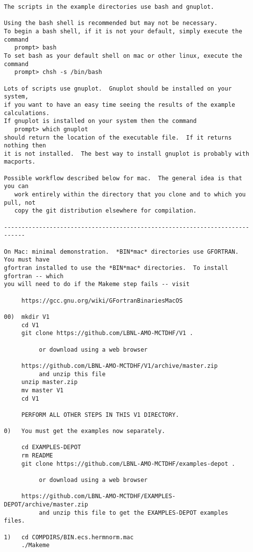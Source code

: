 \begin{verbatim}
The scripts in the example directories use bash and gnuplot.  

Using the bash shell is recommended but may not be necessary.
To begin a bash shell, if it is not your default, simply execute the command
   prompt> bash
To set bash as your default shell on mac or other linux, execute the command
   prompt> chsh -s /bin/bash

Lots of scripts use gnuplot.  Gnuplot should be installed on your system,
if you want to have an easy time seeing the results of the example calculations.
If gnuplot is installed on your system then the command
   prompt> which gnuplot
should return the location of the executable file.  If it returns nothing then
it is not installed.  The best way to install gnuplot is probably with macports.

Possible workflow described below for mac.  The general idea is that you can 
   work entirely within the directory that you clone and to which you pull, not 
   copy the git distribution elsewhere for compilation.

----------------------------------------------------------------------------

On Mac: minimal demonstration.  *BIN*mac* directories use GFORTRAN.  You must have
gfortran installed to use the *BIN*mac* directories.  To install gfortran -- which
you will need to do if the Makeme step fails -- visit 

     https://gcc.gnu.org/wiki/GFortranBinariesMacOS

00)  mkdir V1
     cd V1
     git clone https://github.com/LBNL-AMO-MCTDHF/V1 .

          or download using a web browser

     https://github.com/LBNL-AMO-MCTDHF/V1/archive/master.zip
          and unzip this file
     unzip master.zip
     mv master V1
     cd V1

     PERFORM ALL OTHER STEPS IN THIS V1 DIRECTORY.

0)   You must get the examples now separately.

     cd EXAMPLES-DEPOT
     rm README
     git clone https://github.com/LBNL-AMO-MCTDHF/examples-depot .

          or download using a web browser

     https://github.com/LBNL-AMO-MCTDHF/EXAMPLES-DEPOT/archive/master.zip
          and unzip this file to get the EXAMPLES-DEPOT examples files.

1)   cd COMPDIRS/BIN.ecs.hermnorm.mac
     ./Makeme


\end{verbatim}
